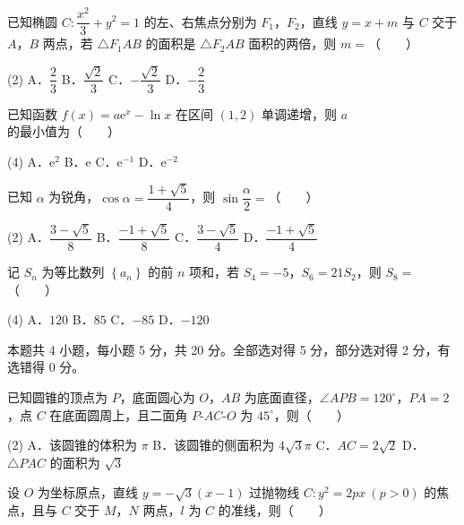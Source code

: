 已知椭圆 $C:\dfrac{x^{2}}3+y^{2}=1$ 的左、右焦点分别为 $F_1$，$F_2$，直线 $y=x+m$ 与 $C$ 交于 $A$，$B$ 两点，若 $\triangle F_1AB$ 的面积是 $\triangle F_2AB$ 面积的两倍，则 $m=$（　　）

\begin{gkopts}(2)
\task A．$\dfrac23$
\task B．$\dfrac{\sqrt2}3$
\task C．$-\dfrac{\sqrt2}3$
\task D．$-\dfrac23$
\end{gkopts}

已知函数 $f(x)=a\mathrm e^{x}-\ln x$ 在区间 $(1,2)$ 单调递增，则 $a$ 的最小值为（　　）

\begin{gkopts}(4)
\task A．$\mathrm e^{2}$
\task B．$\mathrm e$
\task C．$\mathrm e^{-1}$
\task D．$\mathrm e^{-2}$
\end{gkopts}

已知 $\alpha$ 为锐角，$\cos\alpha=\dfrac{1+\sqrt5}4$，则 $\sin\dfrac\alpha2=$（　　）

\begin{gkopts}(2)
\task A．$\dfrac{3-\sqrt5}8$
\task B．$\dfrac{-1+\sqrt5}8$
\task C．$\dfrac{3-\sqrt5}4$
\task D．$\dfrac{-1+\sqrt5}4$
\end{gkopts}

记 $S_n$ 为等比数列 $\left\{a_n\right\}$ 的前 $n$ 项和，若 $S_4=-5$，$S_6=21S_2$，则 $S_8=$（　　）

\begin{gkopts}(4)
\task A．$120$
\task B．$85$
\task C．$-85$
\task D．$-120$
\end{gkopts}

\par\medskip


\begin{gktip}
本题共 4 小题，每小题 5 分，共 20 分。全部选对得 5 分，部分选对得 2 分，有选错得 0 分。
\end{gktip}

已知圆锥的顶点为 $P$，底面圆心为 $O$，$AB$ 为底面直径，$\angle APB=120^\circ$，$PA=2$，点 $C$ 在底面圆周上，且二面角 $P\text{-}AC\text{-}O$ 为 $45^\circ$，则（　　）

\begin{gkopts}(2)
\task A．该圆锥的体积为 $\pi$
\task B．该圆锥的侧面积为 $4\sqrt3\pi$
\task C．$AC=2\sqrt2$
\task D．$\triangle PAC$ 的面积为 $\sqrt3$
\end{gkopts}

设 $O$ 为坐标原点，直线 $y=-\sqrt3(x-1)$ 过抛物线 $C:y^{2}=2px\ (p>0)$ 的焦点，且与 $C$ 交于 $M$，$N$ 两点，$l$ 为 $C$ 的准线，则（　　）

